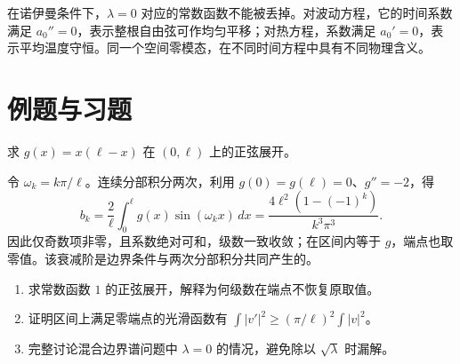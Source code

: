 在诺伊曼条件下，$\lambda=0$ 对应的常数函数不能被丢掉。对波动方程，它的时间系数满足 $a_0''=0$，表示整根自由弦可作均匀平移；对热方程，系数满足 $a_0'=0$，表示平均温度守恒。同一个空间零模态，在不同时间方程中具有不同物理含义。

\section{例题与习题}
\begin{example}
求 $g(x)=x(\ell-x)$ 在 $(0,\ell)$ 上的正弦展开。
\end{example}
\begin{solve}
令 $\omega_k=k\pi/\ell$。连续分部积分两次，利用 $g(0)=g(\ell)=0$、$g''=-2$，得
\[
 b_k=\frac2\ell\int_0^\ell g(x)\sin(\omega_kx)\,dx
 =\frac{4\ell^2(1-(-1)^k)}{k^3\pi^3}.
\]
因此仅奇数项非零，且系数绝对可和，级数一致收敛；在区间内等于 $g$，端点也取零值。该衰减阶是边界条件与两次分部积分共同产生的。
\end{solve}
\begin{enumerate}
 \item 求常数函数 $1$ 的正弦展开，解释为何级数在端点不恢复原取值。
 \item 证明区间上满足零端点的光滑函数有 $\int|v'|^2\ge(\pi/\ell)^2\int|v|^2$。
 \item 完整讨论混合边界谱问题中 $\lambda=0$ 的情况，避免除以 $\sqrt\lambda$ 时漏解。
\end{enumerate}

